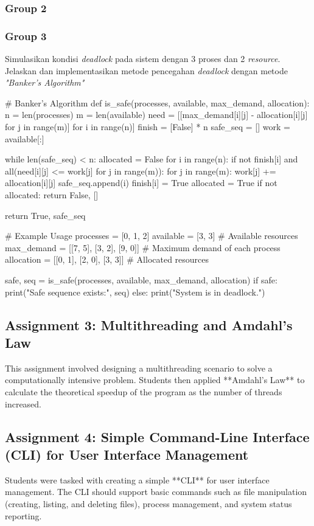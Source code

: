 \documentclass[12pt]{article}
\begin{document}
\subsubsection{Group 2}
\subsubsection{Group 3}
Simulasikan kondisi \textit{deadlock} pada sistem dengan 3 proses dan 2 \textit{resource}. Jelaskan dan implementasikan metode pencegahan \textit{deadlock} dengan metode \textit{"Banker’s Algorithm"}

\begin{python}
    # Banker's Algorithm
def is_safe(processes, available, max_demand, allocation):
    n = len(processes)
    m = len(available)
    need = [[max_demand[i][j] - allocation[i][j] for j in range(m)] for i in range(n)]
    finish = [False] * n
    safe_seq = []
    work = available[:]
    
    while len(safe_seq) < n:
        allocated = False
        for i in range(n):
            if not finish[i] and all(need[i][j] <= work[j] for j in range(m)):
                for j in range(m):
                    work[j] += allocation[i][j]
                safe_seq.append(i)
                finish[i] = True
                allocated = True
        if not allocated:
            return False, []
    
    return True, safe_seq

# Example Usage
processes = [0, 1, 2]
available = [3, 3]  # Available resources
max_demand = [[7, 5], [3, 2], [9, 0]]  # Maximum demand of each process
allocation = [[0, 1], [2, 0], [3, 3]]  # Allocated resources

safe, seq = is_safe(processes, available, max_demand, allocation)
if safe:
    print("Safe sequence exists:", seq)
else:
    print("System is in deadlock.")

\end{python}

\subsection{Assignment 3: Multithreading and Amdahl's Law}
This assignment involved designing a multithreading scenario to solve a computationally intensive problem. Students then applied **Amdahl's Law** to calculate the theoretical speedup of the program as the number of threads increased.

\subsection{Assignment 4: Simple Command-Line Interface (CLI) for User Interface Management}
Students were tasked with creating a simple **CLI** for user interface management. The CLI should support basic commands such as file manipulation (creating, listing, and deleting files), process management, and system status reporting.
\end{document}

